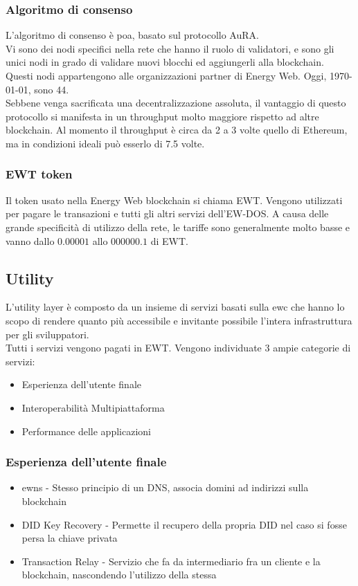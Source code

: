 \documentclass[12pt, letterpaper, twoside]{article}
\begin{document}
\subsubsection{Algoritmo di consenso}
L'algoritmo di consenso è \gls{poa}, basato sul protocollo AuRA\cite{art:aura}. \\
Vi sono dei nodi specifici nella rete che hanno il ruolo di validatori, e sono gli unici nodi in grado di validare nuovi blocchi ed aggiungerli alla blockchain.
Questi nodi appartengono alle organizzazioni partner di Energy Web. Oggi, \today, sono 44.\\
Sebbene venga sacrificata una decentralizzazione assoluta, il vantaggio di questo protocollo si manifesta in un throughput molto maggiore rispetto ad altre blockchain.
Al momento il throughput è circa da 2 a 3 volte quello di Ethereum, ma in condizioni ideali può esserlo di 7.5 volte\cite{art:ew-dos}.

\subsubsection{EWT token}
Il token usato nella Energy Web blockchain si chiama EWT.
Vengono utilizzati per pagare le transazioni e tutti gli altri servizi dell'EW-DOS.
A causa delle grande specificità di utilizzo della rete, le tariffe sono generalmente molto basse e vanno dallo $0.00001$ allo $000000.1$ di EWT.

\subsection{Utility}
L'utility layer è composto da un insieme di servizi basati sulla \gls{ewc} che hanno lo scopo di rendere quanto più accessibile e invitante possibile l'intera infrastruttura per gli sviluppatori.\\
Tutti i servizi vengono pagati in EWT.
Vengono individuate 3 ampie categorie di servizi:
\begin{itemize}
    \item Esperienza dell'utente finale
    \item Interoperabilità Multipiattaforma
    \item Performance delle applicazioni
\end{itemize}

\subsubsection{Esperienza dell'utente finale}
\begin{itemize}
    \item \gls{ewns} - Stesso principio di un DNS, associa domini ad indirizzi sulla blockchain
    \item DID Key Recovery - Permette il recupero della propria DID nel caso si fosse persa la chiave privata
    \item Transaction Relay - Servizio che fa da intermediario fra un cliente e la blockchain, nascondendo l'utilizzo della stessa
\end{itemize}
\end{document}
